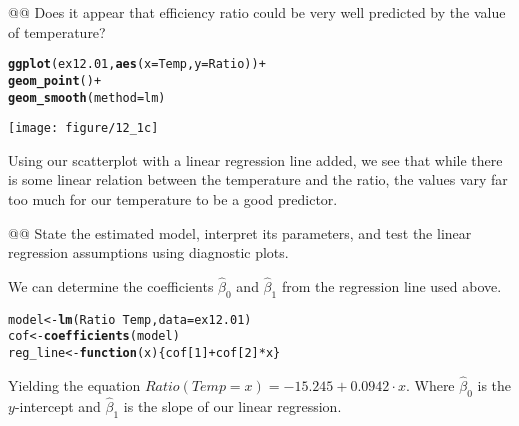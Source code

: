 \documentclass[10pt]{article}\usepackage[]{graphicx}\usepackage[]{xcolor}
\makeatletter
\def\maxwidth{ %
  \ifdim\Gin@nat@width>\linewidth
    \linewidth
  \else
    \Gin@nat@width
  \fi
}
\newcommand{\hlnum}[1]{\textcolor[rgb]{0.686,0.059,0.569}{#1} }%
\newcommand{\hlopt}[1]{\textcolor[rgb]{0,0,0}{#1} }%
\newcommand{\hlstd}[1]{\textcolor[rgb]{0.345,0.345,0.345}{#1} }%
\newcommand{\hlkwa}[1]{\textcolor[rgb]{0.161,0.373,0.58}{\textbf{#1} } }%
\newcommand{\hlkwb}[1]{\textcolor[rgb]{0.69,0.353,0.396}{#1} }%
\newcommand{\hlkwc}[1]{\textcolor[rgb]{0.333,0.667,0.333}{#1} }%
\newcommand{\hlkwd}[1]{\textcolor[rgb]{0.737,0.353,0.396}{\textbf{#1} } }%
\newenvironment{kframe}{%
 \def\at@end@of@kframe{}%
 \ifinner\ifhmode%
  \def\at@end@of@kframe{\end{minipage} }%
  \begin{minipage}{\columnwidth}%
 \fi\fi%
 \def\FrameCommand##1{\hskip\@totalleftmargin \hskip-\fboxsep
 \colorbox{shadecolor}{##1}\hskip-\fboxsep
     \hskip-\linewidth \hskip-\@totalleftmargin \hskip\columnwidth}%
 \MakeFramed {\advance\hsize-\width
   \@totalleftmargin\z@ \linewidth\hsize
   \@setminipage} }%
 {\par\unskip\endMakeFramed%
 \at@end@of@kframe}
\newenvironment{knitrout}{}{} %
\makeatother
\begin{document}
\begin{easylist}[enumerate]
    @@ Does it appear that efficiency ratio could be very well predicted by the value of temperature?

\begin{knitrout}
\color{fgcolor}\begin{kframe}
\begin{alltt}
         \hlkwd{ggplot}\hlstd{(ex12.01,} \hlkwd{aes}\hlstd{(}\hlkwc{x}\hlstd{=Temp,} \hlkwc{y}\hlstd{=Ratio))} \hlopt{+}
            \hlkwd{geom_point}\hlstd{()} \hlopt{+}
            \hlkwd{geom_smooth}\hlstd{(}\hlkwc{method}\hlstd{=lm)}
\end{alltt}
\end{kframe}

{\centering \texttt{[image: figure/12\_1c]} 

}



\end{knitrout}


    Using our scatterplot with a linear regression line added, we see that while there is some linear relation between
    the temperature and the ratio, the values vary far too much for our temperature to be a good predictor.

    @@ State the estimated model, interpret its parameters, and test the linear regression assumptions using diagnostic
    plots.\newline

    We can determine the coefficients $\hat{\beta}_0$ and $\hat{\beta}_1$ from the regression line used above.

\begin{knitrout}
\color{fgcolor}\begin{kframe}
\begin{alltt}
         \hlstd{model} \hlkwb{<-} \hlkwd{lm}\hlstd{(Ratio}\hlopt{~}\hlstd{Temp,} \hlkwc{data}\hlstd{=ex12.01)}
         \hlstd{cof} \hlkwb{<-} \hlkwd{coefficients}\hlstd{(model)}
         \hlstd{reg_line} \hlkwb{<-} \hlkwa{function}\hlstd{(}\hlkwc{x}\hlstd{) \{ cof[}\hlnum{1}\hlstd{]} \hlopt{+} \hlstd{cof[}\hlnum{2}\hlstd{]} \hlopt{*} \hlstd{x \} }
\end{alltt}
\end{kframe}
\end{knitrout}


    Yielding the equation $\boxed{Ratio(Temp=x) = -15.245 + 0.0942 \cdot x}$. Where $\hat{\beta}_0$ is
    the $y$-intercept and $\hat{\beta}_1$ is the slope of our linear regression.\newline


\end{easylist}
\end{document}
